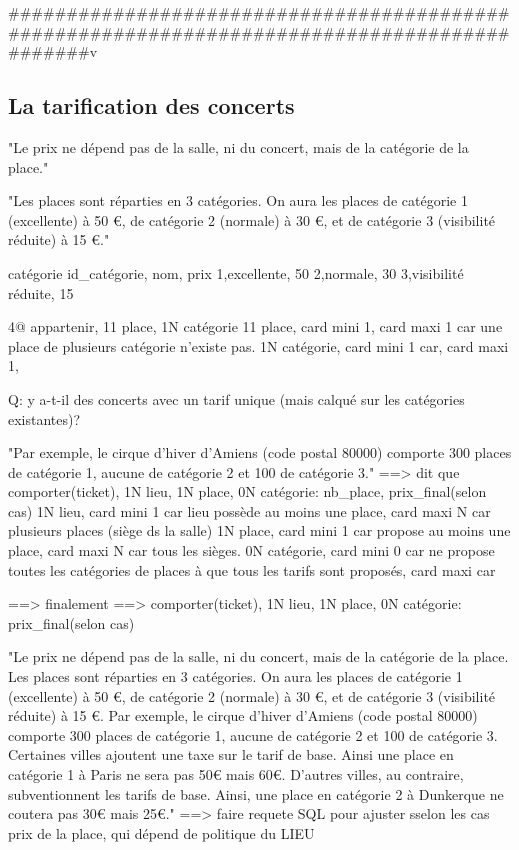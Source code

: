 \documentclass[12pt,a4paper]{article}
\begin{document}
{#############################################################################################v





\subsection{La tarification des concerts}


"Le prix ne dépend pas de la salle, ni du concert, mais de la catégorie de la place."

"Les places sont réparties en 3 catégories. On aura les places de catégorie 1 (excellente) à 50 €, de catégorie 2 (normale) à 30 €, et de catégorie 3 (visibilité réduite) à 15 €."

catégorie
id_catégorie, nom, prix
1,excellente, 50
2,normale, 30
3,visibilité réduite, 15



4@ appartenir, 11 place, 1N catégorie
11 place, card mini 1, card maxi 1 car une place de plusieurs catégorie n'existe pas.
1N catégorie, card mini 1 car, card maxi 1, 

Q: y a-t-il des concerts avec un tarif unique (mais calqué sur les catégories existantes)?




"Par exemple, le cirque d'hiver d'Amiens (code postal 80000) comporte 300 places de catégorie 1, aucune de catégorie 2 et 100 de catégorie 3."
==> dit que comporter(ticket), 1N lieu, 1N place, 0N catégorie: nb_place, prix_final(selon cas)
1N lieu, card mini 1 car lieu possède au moins une place, card maxi N car plusieurs places (siège ds la salle)
1N place, card mini 1 car propose au moins une place, card maxi N car tous les sièges.
0N catégorie, card mini 0 car ne propose toutes les catégories de places à  que tous les tarifs sont proposés, card maxi car

==> finalement 
==> comporter(ticket), 1N lieu, 1N place, 0N catégorie: prix_final(selon cas)



"Le prix ne dépend pas de la salle, ni du concert, mais de la catégorie de la place. Les places sont réparties en 3 catégories. On aura les places de catégorie 1 (excellente) à 50 €, de catégorie 2 (normale) à 30 €, et de catégorie 3 (visibilité réduite) à 15 €. Par exemple, le cirque d'hiver d'Amiens (code postal 80000) comporte 300 places de catégorie 1, aucune de catégorie 2 et 100 de catégorie 3.
Certaines villes ajoutent une taxe sur le tarif de base. Ainsi une place en catégorie 1 à Paris ne sera pas 50€ mais 60€. D’autres villes, au contraire, subventionnent les tarifs de base. Ainsi, une place en catégorie 2 à Dunkerque ne coutera pas 30€ mais 25€."
==> faire requete SQL pour ajuster sselon les cas prix de la place, qui dépend de politique du LIEU



}
\end{document}
